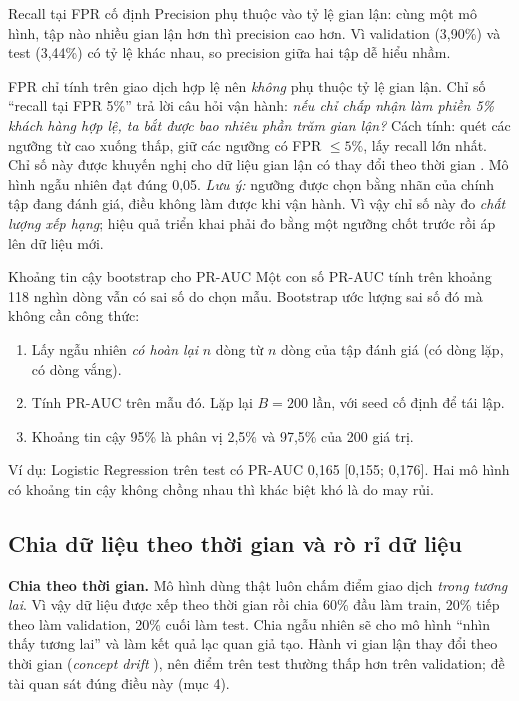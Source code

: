 \documentclass[11pt,a4paper]{article}
\begin{document}
\begin{explain}{Recall tại FPR cố định}
Precision phụ thuộc vào tỷ lệ gian lận: cùng một mô hình, tập nào nhiều gian lận hơn thì precision cao hơn. Vì validation (3,90\%) và test (3,44\%) có tỷ lệ khác nhau, so precision giữa hai tập dễ hiểu nhầm.

FPR chỉ tính trên giao dịch hợp lệ nên \emph{không} phụ thuộc tỷ lệ gian lận. Chỉ số ``recall tại FPR 5\%'' trả lời câu hỏi vận hành: \emph{nếu chỉ chấp nhận làm phiền 5\% khách hàng hợp lệ, ta bắt được bao nhiêu phần trăm gian lận?} Cách tính: quét các ngưỡng từ cao xuống thấp, giữ các ngưỡng có FPR $\le 5\%$, lấy recall lớn nhất. Chỉ số này được khuyến nghị cho dữ liệu gian lận có thay đổi theo thời gian \cite{jesus}. Mô hình ngẫu nhiên đạt đúng 0,05. \emph{Lưu ý:} ngưỡng được chọn bằng nhãn của chính tập đang đánh giá, điều không làm được khi vận hành. Vì vậy chỉ số này đo \emph{chất lượng xếp hạng}; hiệu quả triển khai phải đo bằng một ngưỡng chốt trước rồi áp lên dữ liệu mới.
\end{explain}

\begin{explain}{Khoảng tin cậy bootstrap cho PR-AUC}
Một con số PR-AUC tính trên khoảng 118 nghìn dòng vẫn có sai số do chọn mẫu. Bootstrap ước lượng sai số đó mà không cần công thức:
\begin{enumerate}
  \item Lấy ngẫu nhiên \emph{có hoàn lại} $n$ dòng từ $n$ dòng của tập đánh giá (có dòng lặp, có dòng vắng).
  \item Tính PR-AUC trên mẫu đó. Lặp lại $B=200$ lần, với seed cố định để tái lập.
  \item Khoảng tin cậy 95\% là phân vị 2,5\% và 97,5\% của 200 giá trị.
\end{enumerate}
Ví dụ: Logistic Regression trên test có PR-AUC 0,165 [0,155; 0,176]. Hai mô hình có khoảng tin cậy không chồng nhau thì khác biệt khó là do may rủi.
\end{explain}

\subsection{Chia dữ liệu theo thời gian và rò rỉ dữ liệu}

\textbf{Chia theo thời gian.} Mô hình dùng thật luôn chấm điểm giao dịch \emph{trong tương lai}. Vì vậy dữ liệu được xếp theo thời gian rồi chia 60\% đầu làm train, 20\% tiếp theo làm validation, 20\% cuối làm test. Chia ngẫu nhiên sẽ cho mô hình ``nhìn thấy tương lai'' và làm kết quả lạc quan giả tạo. Hành vi gian lận thay đổi theo thời gian (\emph{concept drift} \cite{gama}), nên điểm trên test thường thấp hơn trên validation; đề tài quan sát đúng điều này (mục 4).
\end{document}
